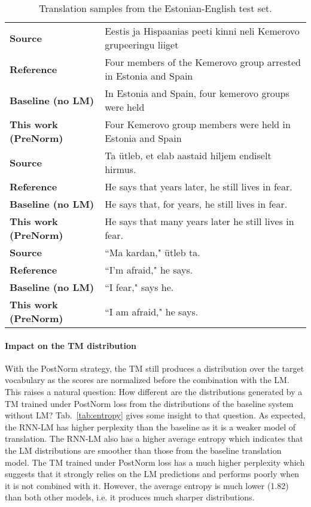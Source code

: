 \documentclass[11pt,a4paper]{article}
\begin{document}
\begin{table*}[t!]
\centering
\small
\begin{tabular}{|l|l|}
\hline
{\bf Source} & Eestis ja Hispaanias peeti kinni neli Kemerovo grupeeringu liiget \\
{\bf Reference} & Four members of the Kemerovo group arrested in Estonia and Spain \\
{\bf Baseline (no LM)} & In Estonia and Spain, four kemerovo groups were held \\
{\bf This work ({\sc PreNorm})} & Four Kemerovo group members were held in Estonia and Spain \\
\hline
{\bf Source} & Ta ütleb, et elab aastaid hiljem endiselt hirmus.  \\
{\bf Reference} & He says that years later, he still lives in fear. \\
{\bf Baseline (no LM)} & He says that, for years, he still lives in fear. \\
{\bf This work ({\sc PreNorm})} & He says that many years later he still lives in fear. \\
\hline
{\bf Source} & ``Ma kardan," ütleb ta. \\
{\bf Reference} & ``I'm afraid," he says. \\
{\bf Baseline (no LM)} & ``I fear," says he. \\
{\bf This work ({\sc PreNorm})} & ``I am afraid," he says. \\
\hline
\end{tabular}
\caption{Translation samples from the Estonian-English test set.}\label{tab:samples}
\end{table*}


\paragraph{Impact on the TM distribution}

With the {\sc PostNorm} strategy, the TM still produces a distribution over the target vocabulary as the scores are normalized before the combination with the LM. This raises a natural question: How different are the distributions generated by a TM trained under {\sc PostNorm} loss from the distributions of the baseline system without LM? Tab.~\ref{tab:entropy} gives some insight to that question. As expected, the RNN-LM has higher perplexity than the baseline as it is a weaker model of translation. The RNN-LM also has a higher average entropy which indicates that the LM distributions are smoother than those from the baseline translation model. The TM trained under {\sc PostNorm} loss has a much higher perplexity which suggests that it strongly relies on the LM predictions and performs poorly when it is not combined with it. However, the average entropy is much lower (1.82) than both other models, i.e. it produces much sharper distributions.
\end{document}
